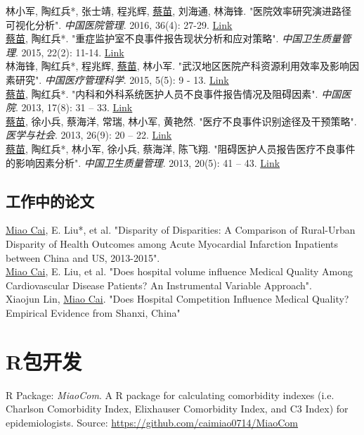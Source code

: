 \documentclass[11pt, a4paper]{article}
\newcommand{\years}[1]{\marginnote{\scriptsize #1}}
\begin{document}
\years{2016}林小军, 陶红兵*, 张士靖, 程兆辉, \underline{蔡苗}, 刘海通, 林海锋. "医院效率研究演进路径可视化分析". \emph{中国医院管理}. 2016, 36(4): 27-29. \href{http://www.cnki.com.cn/Article/CJFDTOTAL-YYGL201604015.htm}{Link}\\
\years{2015}\underline{蔡苗}, 陶红兵*. "重症监护室不良事件报告现状分析和应对策略". \emph{中国卫生质量管理}. 2015, 22(2): 11-14. \href{http://www.cnki.com.cn/Article/CJFDTOTAL-WSJG201502008.htm}{Link}\\
\years{2015} 林海锋, 陶红兵*, 程兆辉, \underline{蔡苗}, 林小军. "武汉地区医院产科资源利用效率及影响因素研究". \emph{中国医疗管理科学}. 2015, 5(5): 9 - 13. \href{http://www.cnki.com.cn/Article/CJFDTOTAL-YLGL201505004.htm}{Link}\\
\years{2013}\underline{蔡苗}, 陶红兵*. "内科和外科系统医护人员不良事件报告情况及阻碍因素". \emph{中国医院}. 2013, 17(8): 31 – 33. \href{http://www.cnki.com.cn/Article/CJFDTOTAL-ZGYU201308016.htm}{Link}\\
\years{2013}\underline{蔡苗},  徐小兵, 蔡海洋, 常瑞, 林小军, 黄艳然. "医疗不良事件识别途径及干预策略". \emph{医学与社会}. 2013, 26(9): 20 – 22. \href{http://www.cnki.com.cn/Article/CJFDTOTAL-YXSH201309007.htm}{Link}\\
\years{2013}\underline{蔡苗}, 陶红兵*, 林小军, 徐小兵, 蔡海洋, 陈飞翔. "阻碍医护人员报告医疗不良事件的影响因素分析". \emph{中国卫生质量管理}. 2013, 20(5): 41 – 43. \href{http://www.cqvip.com/qk/98273x/201305/47221843.html}{Link}

\subsection*{工作中的论文}
\noindent
\underline{Miao Cai}, E. Liu*, et al. "Disparity of Disparities: A Comparison of Rural-Urban Disparity of Health Outcomes among Acute Myocardial Infarction Inpatients between China and US, 2013-2015".\\
\underline{Miao Cai}, E. Liu, et al. "Does hospital volume influence Medical Quality Among Cardiovascular Disease Patients? An Instrumental Variable Approach".\\
Xiaojun Lin, \underline{Miao Cai}. "Does Hospital Competition Influence Medical Quality? Empirical Evidence from Shanxi, China"

\section*{R包开发}
R Package: \emph{MiaoCom}. A R package for calculating comorbidity indexes (i.e. Charlson Comorbidity Index, Elixhauser Comorbidity Index, and C3 Index) for epidemiologists. Source: \href{https://github.com/caimiao0714/MiaoCom}{https://github.com/caimiao0714/MiaoCom}
\end{document}
